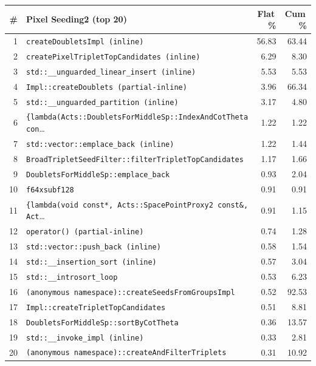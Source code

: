 \begin{tabular}{rlrr}
\toprule
\textbf{\#} & \textbf{Pixel Seeding2 (top 20)} & \textbf{Flat\,\%} & \textbf{Cum\,\%} \\
\midrule
1 & \texttt{createDoubletsImpl (inline)} & 56.83 & 63.44 \\
2 & \texttt{createPixelTripletTopCandidates (inline)} & 6.29 & 8.30 \\
3 & \texttt{std::\_\_unguarded\_linear\_insert (inline)} & 5.53 & 5.53 \\
4 & \texttt{Impl::createDoublets (partial-inline)} & 3.96 & 66.34 \\
5 & \texttt{std::\_\_unguarded\_partition (inline)} & 3.17 & 4.80 \\
6 & \texttt{\{lambda(Acts::DoubletsForMiddleSp::IndexAndCotTheta con}\ldots & 1.22 & 1.22 \\
7 & \texttt{std::vector::emplace\_back (inline)} & 1.22 & 1.44 \\
8 & \texttt{BroadTripletSeedFilter::filterTripletTopCandidates} & 1.17 & 1.66 \\
9 & \texttt{DoubletsForMiddleSp::emplace\_back} & 0.93 & 2.04 \\
10 & \texttt{f64xsubf128} & 0.91 & 0.91 \\
11 & \texttt{\{lambda(void const*, Acts::SpacePointProxy2 const\&, Act}\ldots & 0.91 & 1.15 \\
12 & \texttt{operator() (partial-inline)} & 0.74 & 1.28 \\
13 & \texttt{std::vector::push\_back (inline)} & 0.58 & 1.54 \\
14 & \texttt{std::\_\_insertion\_sort (inline)} & 0.57 & 3.04 \\
15 & \texttt{std::\_\_introsort\_loop} & 0.53 & 6.23 \\
16 & \texttt{(anonymous namespace)::createSeedsFromGroupsImpl} & 0.52 & 92.53 \\
17 & \texttt{Impl::createTripletTopCandidates} & 0.51 & 8.81 \\
18 & \texttt{DoubletsForMiddleSp::sortByCotTheta} & 0.36 & 13.57 \\
19 & \texttt{std::\_\_invoke\_impl (inline)} & 0.33 & 2.81 \\
20 & \texttt{(anonymous namespace)::createAndFilterTriplets} & 0.31 & 10.92 \\
\bottomrule
\end{tabular}
